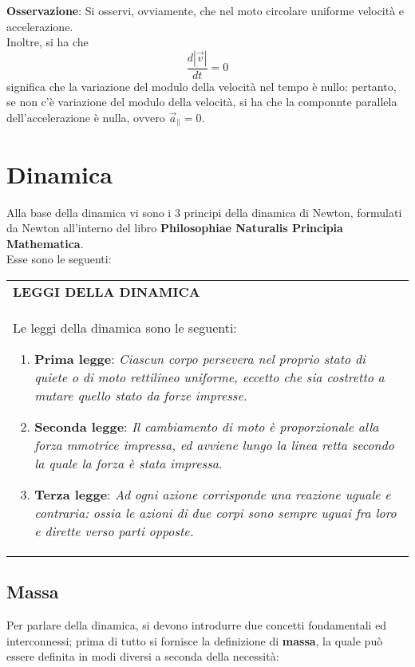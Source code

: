 \documentclass[a4paper]{extarticle}
\renewcommand\arraystretch{}
\begin{document}
\vspace{1em}
\noindent
\textbf{Osservazione}: Si osservi, ovviamente, che nel moto circolare uniforme velocità e accelerazione.\\
Inoltre, si ha che
\[\frac{d \left \vert \vec{v} \right \vert}{dt} = 0\]
significa che la variazione del modulo della velocità nel tempo è nullo: pertanto, se non c'è variazione del modulo della velocità, si ha che la componnte parallela dell'accelerazione è nulla, ovvero $\vec{a}_\parallel = 0$.

\newpage
\section{Dinamica}
Alla base della dinamica vi sono i $3$ principi della dinamica di Newton, formulati da Newton all'interno del libro \textbf{Philosophiae Naturalis Principia Mathematica}.\\
Esse sono le seguenti:

\vspace{1em}
\setlength{\tabcolsep}{14pt}
\renewcommand{\arraystretch}{2}
\noindent
\begin{tabularx}{\textwidth}{@{}|P|@{}}
    \hline
    {\textbf{LEGGI DELLA DINAMICA}}\\
    \parbox{\linewidth}{Le leggi della dinamica sono le seguenti:
    \begin{enumerate}
      \item \textbf{Prima legge}: \emph{Ciascun corpo persevera nel proprio stato di quiete o di moto rettilineo uniforme, eccetto che sia costretto a mutare quello stato da forze impresse.}
      \item \textbf{Seconda legge}: \emph{Il cambiamento di moto è proporzionale alla forza mmotrice impressa, ed avviene lungo la linea retta secondo la quale la forza è stata impressa.}
      \item \textbf{Terza legge}: \emph{Ad ogni azione corrisponde una reazione uguale e contraria: ossia le azioni di due corpi sono sempre uguai fra loro e dirette verso parti opposte.}
    \end{enumerate}
    \vspace{1mm}}\\
    \hline
\end{tabularx}
\vspace{1em}

\subsection{Massa}
Per parlare della dinamica, si devono introdurre due concetti fondamentali ed interconnessi; prima di tutto si fornisce la definizione di \textbf{massa}, la quale può essere definita in modi diversi a seconda della necessità:
\end{document}
